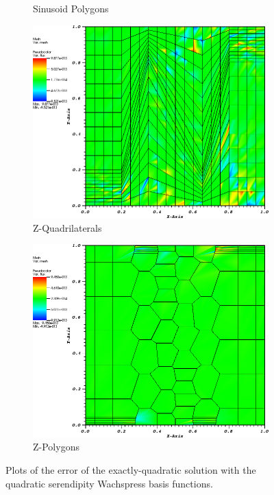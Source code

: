 \begin{figure}
{\begin{subfigure}[b]{0.465\textwidth}
		\caption{Sinusoid Polygons}
	\end{subfigure}
}
{
	\vspace{3mm}
	\begin{subfigure}[b]{0.465\textwidth}
		\centering
		\label{subfig::z_quad_me_k2_lin_sol}
		\includegraphics[width=\textwidth]{figures/sec_BF/quad_err_zquad_Wach2.png}
		\caption{Z-Quadrilaterals}
	\end{subfigure}
	\hfill
	\begin{subfigure}[b]{0.465\textwidth}
		\centering
		\label{subfig::z_poly_me_k2_lin_sol}
		\includegraphics[width=\textwidth]{figures/sec_BF/quad_err_zpoly_Wach2.png}
		\caption{Z-Polygons}
	\end{subfigure}
}
\caption{Plots of the error of the exactly-quadratic solution with the quadratic serendipity Wachspress basis functions.}
\label{fig::BF_Results_quad_err_Wach2}
\end{figure}

